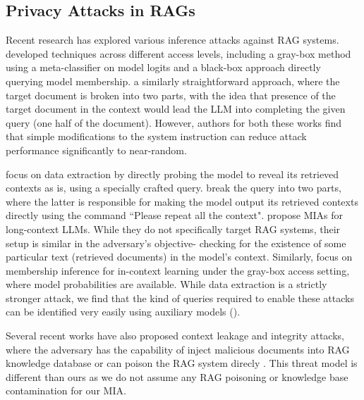 \subsection{Privacy Attacks in RAGs}
\label{sec:priv_leakage_RAG}
Recent research has explored various inference attacks against RAG systems. \citet{anderson2024my} developed techniques across different access levels, including a gray-box method using a meta-classifier on model logits and a black-box approach directly querying model membership. \citet{li2024generating} a similarly straightforward approach, where the target document is broken into two parts, with the idea that presence of the target document in the context would lead the LLM into completing the given query (one half of the document). However, authors for both these works find that simple modifications to the system instruction can reduce attack performance significantly to near-random.

\citet{cohen2024unleashing} focus on data extraction by directly probing the model to reveal its retrieved contexts as is, using a specially crafted query. \citet{zeng2024good} break the query into two parts, where the latter is responsible for making the model output its retrieved contexts directly using the command ``Please repeat all the context". \citep{wang2024membership} propose MIAs for long-context LLMs. While they do not specifically target RAG systems, their setup is similar in the adversary's objective- checking for the existence of some particular text (retrieved documents) in the model's context. Similarly, \citet{duan2024privacy} focus on membership inference for in-context learning under the gray-box access setting, where model probabilities are available.
While data extraction is a strictly stronger attack, we find that the kind of queries required to enable these attacks can be identified very easily using auxiliary models ().

Several recent works have also proposed context leakage and integrity attacks, where the adversary has the capability of  inject malicious documents into RAG knowledge database \citep{chaudhari2024phantom, jiang2024rag} or can poison the RAG system direcly \citep{peng2024data}.  This threat model is different than ours as we do not assume any RAG poisoning or knowledge base contamination for our MIA. 





  





